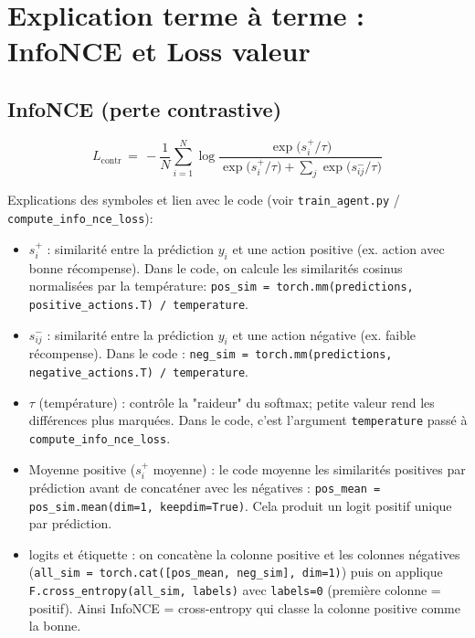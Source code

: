 \documentclass[a4paper,11pt]{article}
\begin{document}
\section*{Explication terme à terme : InfoNCE et Loss valeur}

\subsection*{InfoNCE (perte contrastive)}
\begin{equation}
L_{\text{contr}} \,=\, -\frac{1}{N}\sum_{i=1}^{N} \log\frac{\exp\big(s_{i}^{+}/\tau\big)}{\exp\big(s_{i}^{+}/\tau\big) + \sum_{j}\exp\big(s_{ij}^{-}/\tau\big)}
\end{equation}

Explications des symboles et lien avec le code (voir \texttt{train_agent.py} / \texttt{compute_info_nce_loss}):
\begin{itemize}
  \item $s_{i}^{+}$ : similarité entre la prédiction $y_i$ et une action positive (ex. action avec bonne récompense). Dans le code, on calcule les similarités cosinus normalisées par la température: \texttt{pos\_sim = torch.mm(predictions, positive\_actions.T) / temperature}. \\ 
  \item $s_{ij}^{-}$ : similarité entre la prédiction $y_i$ et une action négative (ex. faible récompense). Dans le code : \texttt{neg\_sim = torch.mm(predictions, negative\_actions.T) / temperature}. \\ 
  \item $\tau$ (température) : contrôle la "raideur" du softmax; petite valeur rend les différences plus marquées. Dans le code, c'est l'argument \texttt{temperature} passé à \texttt{compute\_info\_nce\_loss}. \\ 
  \item Moyenne positive ($s_i^{+}$ moyenne) : le code moyenne les similarités positives par prédiction avant de concaténer avec les négatives : \texttt{pos\_mean = pos\_sim.mean(dim=1, keepdim=True)}. Cela produit un logit positif unique par prédiction. \\ 
  \item logits et étiquette : on concatène la colonne positive et les colonnes négatives (\texttt{all\_sim = torch.cat([pos\_mean, neg\_sim], dim=1)}) puis on applique \texttt{F.cross\_entropy(all\_sim, labels)} avec \texttt{labels=0} (première colonne = positif). Ainsi InfoNCE = cross-entropy qui classe la colonne positive comme la bonne. 
\end{itemize}
\end{document}

